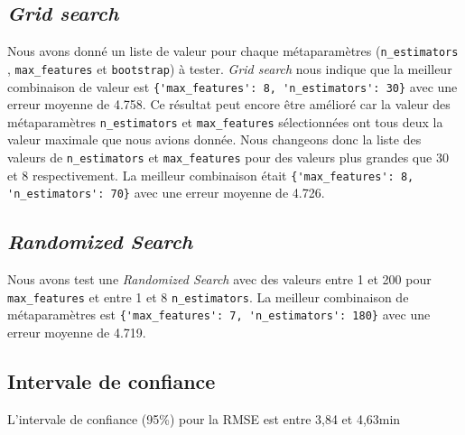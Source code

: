 \subsection{\textit{Grid search}}
Nous avons donné un liste de valeur pour chaque métaparamètres (\lstinline!n_estimators! , \lstinline!max_features! et \lstinline!bootstrap!) à tester. \textit{Grid search} nous indique que la meilleur combinaison de valeur est \lstinline!{'max_features': 8, 'n_estimators': 30}! avec une erreur moyenne de 4.758. Ce résultat peut encore être amélioré car la valeur des métaparamètres \lstinline!n_estimators! et \lstinline!max_features! sélectionnées ont tous deux la valeur maximale que nous avions donnée. Nous changeons donc la liste des valeurs de \lstinline!n_estimators! et \lstinline!max_features! pour des valeurs plus grandes que 30 et 8 respectivement. La meilleur combinaison était \lstinline!{'max_features': 8, 'n_estimators': 70}! avec une erreur moyenne de 4.726.

\subsection{\textit{Randomized Search}}
Nous avons test une \textit{Randomized Search} avec des valeurs entre 1 et 200 pour \lstinline!max_features! et entre 1 et 8 \lstinline!n_estimators!. La meilleur combinaison de métaparamètres est \lstinline!{'max_features': 7, 'n_estimators': 180}! avec une erreur moyenne de 4.719.

\subsection{Intervale de confiance}
L'intervale de confiance (95\%) pour la RMSE est entre 3,84 et 4,63min
